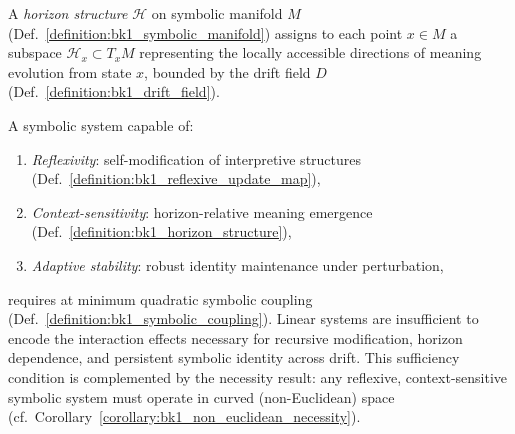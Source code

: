 \begin{definition}
\label{definition:bk1_horizon_structure}
A \emph{horizon structure} $\mathcal{H}$ on symbolic manifold $M$ (Def.~\ref{definition:bk1_symbolic_manifold}) assigns to each point $x \in M$ a subspace $\mathcal{H}_x \subset T_x M$ representing the locally accessible directions of meaning evolution from state $x$, bounded by the drift field $D$ (Def.~\ref{definition:bk1_drift_field}).
\end{definition}

\begin{theorem}
\label{theorem:bk1_minimal_quadratic_sufficiency}
A symbolic system capable of:
\begin{enumerate}
  \item \emph{Reflexivity}: self-modification of interpretive structures (Def.~\ref{definition:bk1_reflexive_update_map}),
  \item \emph{Context-sensitivity}: horizon-relative meaning emergence (Def.~\ref{definition:bk1_horizon_structure}),
  \item \emph{Adaptive stability}: robust identity maintenance under perturbation,
\end{enumerate}
requires at minimum quadratic symbolic coupling (Def.~\ref{definition:bk1_symbolic_coupling}). Linear systems are insufficient to encode the interaction effects necessary for recursive modification, horizon dependence, and persistent symbolic identity across drift. This sufficiency condition is complemented by the necessity result: any reflexive, context-sensitive symbolic system must operate in curved (non-Euclidean) space (cf.~Corollary~\ref{corollary:bk1_non_euclidean_necessity}).
\end{theorem}

